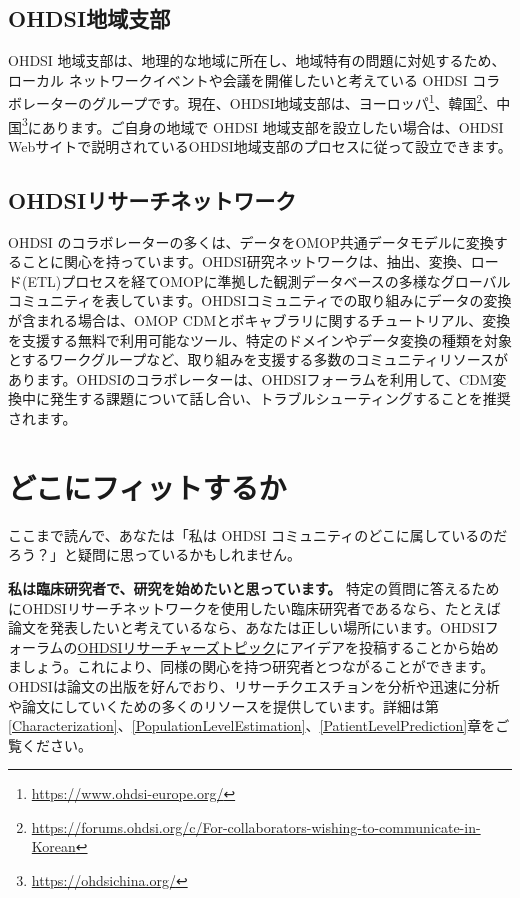 \documentclass[
  11pt]{book}
\theoremstyle{definition}
\theoremstyle{definition}
\theoremstyle{definition}
\theoremstyle{definition}
\theoremstyle{remark}
\begin{document}
\subsection{OHDSI地域支部}\label{ohdsiux5730ux57dfux652fux90e8}

OHDSI 地域支部は、地理的な地域に所在し、地域特有の問題に対処するため、ローカル ネットワークイベントや会議を開催したいと考えている OHDSI コラボレーターのグループです。現在、OHDSI地域支部は、ヨーロッパ\footnote{\url{https://www.ohdsi-europe.org/}}、韓国\footnote{\url{https://forums.ohdsi.org/c/For-collaborators-wishing-to-communicate-in-Korean}}、中国\footnote{\url{https://ohdsichina.org/}}にあります。ご自身の地域で OHDSI 地域支部を設立したい場合は、OHDSI Webサイトで説明されているOHDSI地域支部のプロセスに従って設立できます。

\subsection{OHDSIリサーチネットワーク}\label{ohdsiux30eaux30b5ux30fcux30c1ux30cdux30c3ux30c8ux30efux30fcux30af}

OHDSI のコラボレーターの多くは、データをOMOP共通データモデルに変換することに関心を持っています。OHDSI研究ネットワークは、抽出、変換、ロード(ETL)プロセスを経てOMOPに準拠した観測データベースの多様なグローバルコミュニティを表しています。OHDSIコミュニティでの取り組みにデータの変換が含まれる場合は、OMOP CDMとボキャブラリに関するチュートリアル、変換を支援する無料で利用可能なツール、特定のドメインやデータ変換の種類を対象とするワークグループなど、取り組みを支援する多数のコミュニティリソースがあります。OHDSIのコラボレーターは、OHDSIフォーラムを利用して、CDM変換中に発生する課題について話し合い、トラブルシューティングすることを推奨されます。

\section{どこにフィットするか}\label{ux3069ux3053ux306bux30d5ux30a3ux30c3ux30c8ux3059ux308bux304b}

ここまで読んで、あなたは「私は OHDSI コミュニティのどこに属しているのだろう？」と疑問に思っているかもしれません。

\textbf{私は臨床研究者で、研究を始めたいと思っています。} 特定の質問に答えるためにOHDSIリサーチネットワークを使用したい臨床研究者であるなら、たとえば論文を発表したいと考えているなら、あなたは正しい場所にいます。OHDSIフォーラムの\href{https://forums.ohdsi.org/c/researchers}{OHDSIリサーチャーズトピック}にアイデアを投稿することから始めましょう。これにより、同様の関心を持つ研究者とつながることができます。OHDSIは論文の出版を好んでおり、リサーチクエスチョンを分析や迅速に分析や論文にしていくための多くのリソースを提供しています。詳細は第\ref{Characterization}、\ref{PopulationLevelEstimation}、\ref{PatientLevelPrediction}章をご覧ください。
\end{document}
